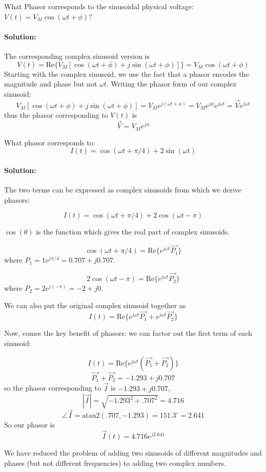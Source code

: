 \begin{ExampleSmall}
What Phasor corresponds to the sinusoidal physical voltage:
$V(t) = V_M\cos(\omega t + \phi)$?

\vspace{0.25in}
\paragraph{Solution:}
The corresponding complex sinusoid version is
\[
V(t) =\text{Re}\{V_M[\cos(\omega t+\phi) + j\sin(\omega t+\phi)]\} = V_M\cos(\omega t+\phi)
\]
Starting with the complex sinusoid, we use the fact that a phasor encodes the magnitude and phase
but not $\omega t$.
Writing the phasor form of our complex sinusoid:
\[
    V_M[\cos(\omega t+\phi) + j\sin(\omega t+\phi)] = V_M e^{j(\omega t+\phi)}
     = V_M e^{j\phi}e^{j\omega t}
     = \vec{V}e^{j\omega t}
\]
thus the phasor corresponding to $V(t)$ is
\[
\vec{V}=V_Me^{j\phi}
\]

\end{ExampleSmall}
\vfill

\begin{ExampleSmall}
What phasor corresponds to:
\[
I(t) = \cos(\omega t+\pi/4) + 2\sin(\omega t)
\]


\paragraph{Solution:} The two terms can be expressed as complex sinusoids from
which we derive phasors:


\[
I(t) = \cos(\omega t+\pi/4) + 2\cos(\omega t-\pi)
\]

$\cos(\theta)$ is the function which gives the real part of complex sinusoids.

\[
\cos(\omega t+\pi/4)= \text{Re}\{e^{j\omega t}\vec{P_1}\}
\]
where $P_1 = 1e^{j\pi/4} = 0.707 + j0.707$.


\[
2\cos(\omega t-\pi) = \text{Re}\{e^{j\omega t}\vec{P_2}\}
\]
where $P_2 = 2e^{j(-\pi)} = -2 + j0$.

We can also put the original complex sinusoid together as
\[
    I(t) = \text{Re}\{e^{j\omega t}\vec{P_1}+e^{j\omega t}\vec{P_2}\}
    \]

Now, comes the key benefit of phasors: we can factor out the first term of each
sinusoid:

\[
I(t) = \text{Re}\{e^{j\omega t}\left (
        \vec{P_1}+\vec{P_2}
        \right ) \}
\]
\[
\vec{P_1}+\vec{P_2} = -1.293 + j0.707
\]
so the phasor corresponding to $\vec{I}$ is $ -1.293 + j0.707$,
\[
|\vec{I}| = \sqrt{-1.293^2+.707^2} = 4.716
\]
\[
\angle{\vec{I}} = \mathrm{atan2}(.707, -1.293) = 151.3^\circ  =2.641
\]
So our phasor is
\[
\vec{I}(t) = 4.716e^{j2.641}
\]

We have reduced the problem of adding two sinusoids of different magnitudes and
phases (but not different frequencies) to adding two complex numbers.
\end{ExampleSmall}




